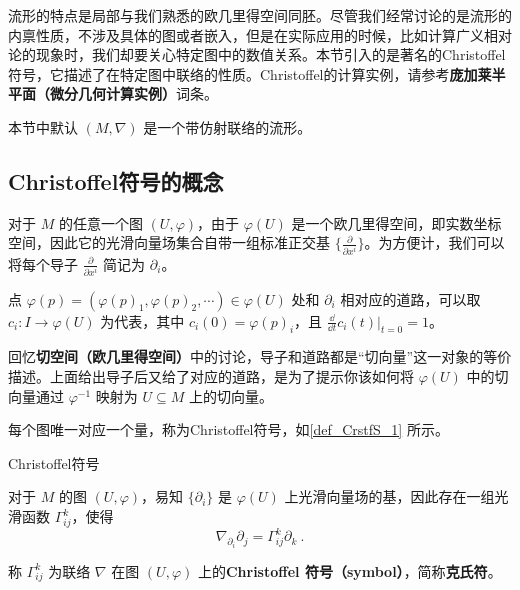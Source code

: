 


流形的特点是局部与我们熟悉的欧几里得空间同胚。尽管我们经常讨论的是流形的内禀性质，不涉及具体的图或者嵌入，但是在实际应用的时候，比如计算广义相对论的现象时，我们却要关心特定图中的数值关系。本节引入的是著名的Christoffel符号，它描述了在特定图中联络的性质。Christoffel的计算实例，请参考\textbf{庞加莱半平面（微分几何计算实例）}词条。

本节中默认 $(M, \nabla)$ 是一个带仿射联络的流形。


\subsection{Christoffel符号的概念}\label{sub_CrstfS_1}

对于 $M$ 的任意一个图 $(U, \varphi)$，由于 $\varphi(U)$ 是一个欧几里得空间，即实数坐标空间，因此它的光滑向量场集合自带一组标准正交基 $\{\frac{\partial}{\partial x^i}\}$。为方便计，我们可以将每个导子 $\frac{\partial}{\partial x^i}$ 简记为 $\partial_i$。

点 $\varphi(p)=(\varphi(p)_1, \varphi(p)_2, \cdots)\in\varphi(U)$ 处和 $\partial_i$ 相对应的道路，可以取 $c_i:I\to \varphi(U)$ 为代表，其中 $c_i(0)=\varphi(p)_i$，且 $\frac{\dd}{\dd t}c_i(t)|_{t=0}=1$。

回忆\textbf{切空间（欧几里得空间）}中的讨论，导子和道路都是“切向量”这一对象的等价描述。上面给出导子后又给了对应的道路，是为了提示你该如何将 $\varphi(U)$ 中的切向量通过 $\varphi^{-1}$ 映射为 $U\subseteq M$ 上的切向量。

每个图唯一对应一个量，称为Christoffel符号，如\autoref{def_CrstfS_1} 所示。

\begin{definition}{Christoffel符号}\label{def_CrstfS_1}

对于 $M$ 的图 $(U, \varphi)$，易知 $\{\partial_i\}$ 是 $\varphi(U)$ 上光滑向量场的基，因此存在一组光滑函数 $\Gamma^k_{ij}$，使得
\begin{equation}
\nabla_{\partial_i}\partial_j=\Gamma^k_{ij}\partial_k~.
\end{equation}

称 $\Gamma^k_{ij}$ 为联络 $\nabla$ 在图 $(U, \varphi)$ 上的\textbf{Christoffel 符号（symbol）}，简称\textbf{克氏符}。
\end{definition}

